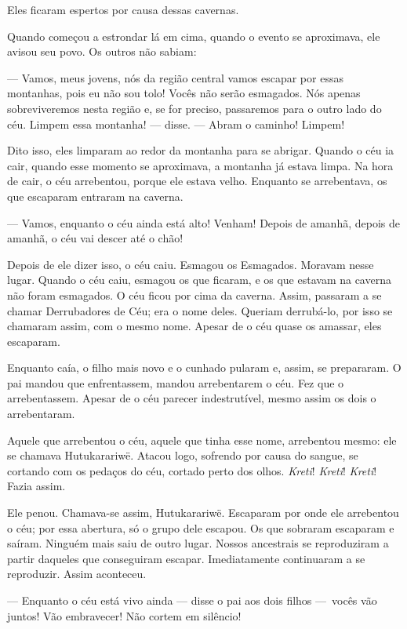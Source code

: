 Eles ficaram espertos por causa dessas cavernas.

Quando começou a estrondar lá em cima, quando o evento se
aproximava, ele avisou seu povo. Os outros não sabiam:

--- Vamos, meus jovens, nós da região central vamos escapar por essas
montanhas, pois eu não sou tolo! Vocês não serão esmagados. Nós apenas
sobreviveremos nesta região e, se for preciso, passaremos para o outro lado
do céu. Limpem essa montanha! --- disse. --- Abram o caminho! Limpem! 

Dito isso, eles limparam ao redor da montanha para se abrigar. Quando o
céu ia cair, quando esse momento se aproximava, a montanha já estava
limpa. Na hora de cair, o céu arrebentou, porque ele estava velho.
Enquanto se arrebentava, os que escaparam entraram na caverna. 

--- Vamos, enquanto o céu ainda está alto! Venham! Depois de amanhã,
depois de amanhã, o céu vai descer até o chão! 

Depois de ele dizer isso, o céu caiu. Esmagou os Esmagados. Moravam
nesse lugar. Quando o céu caiu, esmagou os que ficaram, e os que estavam
na caverna não foram esmagados. O céu ficou por cima da caverna. Assim,
passaram a se chamar Derrubadores de Céu; era o nome deles. Queriam
derrubá-lo, por isso se chamaram assim, com o mesmo nome. Apesar de o
céu quase os amassar, eles escaparam.

Enquanto caía, o filho mais novo e o cunhado pularam e, assim, se
prepararam. O pai mandou que enfrentassem, mandou arrebentarem o céu. Fez
que o arrebentassem. Apesar de o céu parecer indestrutível, mesmo assim
os dois o arrebentaram. 

Aquele que arrebentou o céu, aquele que tinha esse nome, arrebentou
mesmo: ele se chamava Hutukarariwë. Atacou logo, sofrendo por causa do
sangue, se cortando com os pedaços do céu, cortado perto dos
olhos. \textit{Kreti}! \textit{Kreti}! \textit{Kreti}! Fazia assim. 

Ele penou. Chamava-se assim, Hutukarariwë. Escaparam por onde ele
arrebentou o céu; por essa abertura, só o grupo dele escapou. Os que
sobraram escaparam e saíram. Ninguém mais saiu de outro lugar. Nossos
ancestrais se reproduziram a partir daqueles que conseguiram escapar.
Imediatamente continuaram a se reproduzir. Assim aconteceu. 

--- Enquanto o céu está vivo ainda --- disse o pai aos dois filhos ---~vocês vão juntos! Vão embravecer! Não cortem em silêncio!

